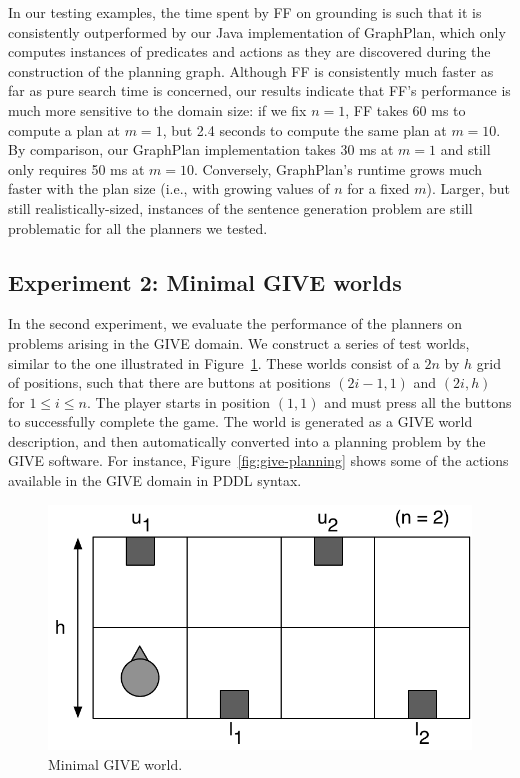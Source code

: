 In our testing examples, the time spent by FF on grounding is such that it
is consistently outperformed by our Java implementation of GraphPlan, which
only computes instances of predicates and actions as they are discovered
during the construction of the planning graph. Although FF is consistently
much faster as far as pure search time is concerned, our results indicate
that FF's performance is much more sensitive to the domain size: if we fix
$n=1$, FF takes 60 ms to compute a plan at $m=1$, but 2.4 seconds to
compute the same plan at $m=10$. By comparison, our GraphPlan
implementation takes 30 ms at $m=1$ and still only requires 50 ms at
$m=10$. Conversely, GraphPlan's runtime grows much faster with the plan
size (i.e., with growing values of $n$ for a fixed $m$). Larger, but still
realistically-sized, instances of the sentence generation problem are still
problematic for all the planners we tested.


\subsection{Experiment 2: Minimal GIVE worlds}
\label{sec:exper-2:-minim}

In the second experiment, we evaluate the performance of the planners on
problems arising in the GIVE domain. We construct a series of test worlds,
similar to the one illustrated in Figure~\ref{fig:give-minimal}. These
worlds consist of a $2n$ by $h$ grid of positions, such that there are
buttons at positions $(2i-1,1)$ and $(2i,h)$ for $1 \leq i \leq n$. The
player starts in position $(1,1)$ and must press all the buttons
to successfully complete the game. The world is generated as a GIVE world
description, and then automatically converted into a planning problem by
the GIVE software. For instance, Figure~\ref{fig:give-planning} shows some
of the actions available in the GIVE domain in PDDL syntax.

\begin{figure}[t]
  \centering
  \includegraphics[width=0.5\columnwidth]{pic-buttons}
  \caption{Minimal GIVE world.}
  \label{fig:give-minimal}
\end{figure}

